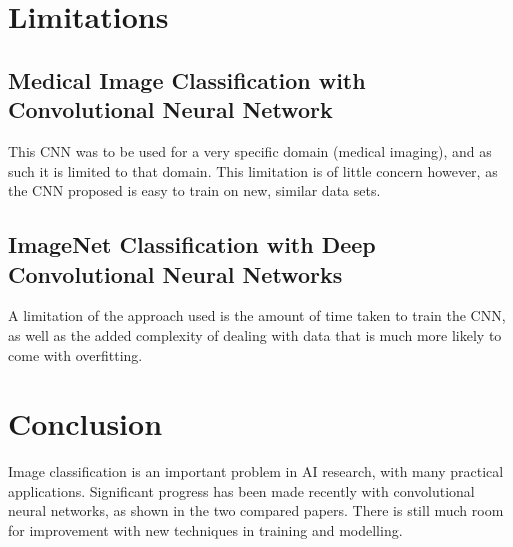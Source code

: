 \documentclass{article}
\begin{document}
\section{Limitations}
\subsection{Medical Image Classification with Convolutional Neural Network}
This CNN was to be used for a very specific domain (medical imaging), and as such it is limited to that domain. This limitation is of little concern however, as the CNN proposed is easy to train on new, similar data sets.

\subsection{ImageNet Classification with Deep Convolutional Neural Networks}
A limitation of the approach used is the amount of time taken to train the CNN, as well as the added complexity of dealing with data that is much more likely to come with overfitting.

\section{Conclusion}
Image classification is an important problem in AI research, with many practical applications. Significant progress has been made recently with convolutional neural networks, as shown in the two compared papers. There is still much room for improvement with new techniques in training and modelling.


\end{document}
